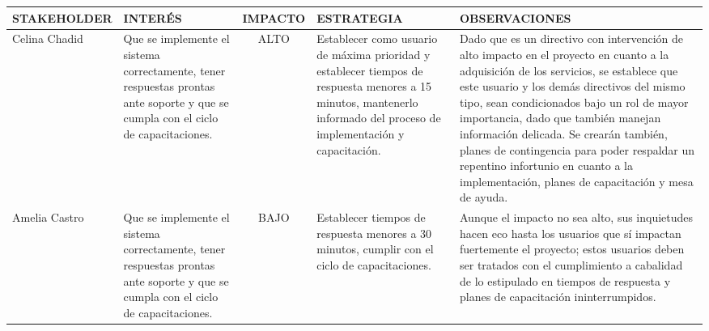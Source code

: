 \begin{table}[H]
	\centering
	\begin{tabular}{| p{3cm} | p{5cm} | c | p{5cm} | p{5cm} |}
	\hline
	\rowcolor{LightGrey}
	\textbf{STAKEHOLDER} & \textbf{INTER\'ES} & \textbf{IMPACTO} & \textbf{ESTRATEGIA} & 
	\textbf{OBSERVACIONES} \\ \hline	
	
	Celina Chadid & Que se implemente el sistema correctamente, tener respuestas prontas
	ante soporte y que se cumpla con el ciclo de capacitaciones. & ALTO & Establecer como 
	usuario de m\'axima prioridad y establecer tiempos de respuesta menores a 15 minutos, 
	mantenerlo informado del proceso de implementaci\'on y capacitaci\'on. & Dado que es un directivo 
	con intervenci\'on de alto impacto en el proyecto en cuanto a la adquisici\'on de los servicios,
	se establece que este usuario y los dem\'as directivos del mismo tipo, sean condicionados bajo un
	rol de mayor importancia, dado que tambi\'en manejan informaci\'on delicada. Se crear\'an tambi\'en,
	planes de contingencia para poder respaldar un repentino infortunio en cuanto a la implementaci\'on,
	planes de capacitaci\'on y mesa de ayuda.\\
	\hline
	
	Amelia Castro & Que se implemente el sistema correctamente, tener respuestas prontas
	ante soporte y que se cumpla con el ciclo de capacitaciones. & BAJO & Establecer tiempos de 
	respuesta menores a 30 minutos, cumplir con el ciclo de capacitaciones. & Aunque el impacto no sea alto,
	sus inquietudes hacen eco hasta los usuarios que s\'i impactan fuertemente el proyecto; estos usuarios
	deben ser tratados con el cumplimiento a cabalidad de lo estipulado en tiempos de respuesta y planes de
	capacitaci\'on ininterrumpidos.\\
	\hline
	\end{tabular}
\end{table}